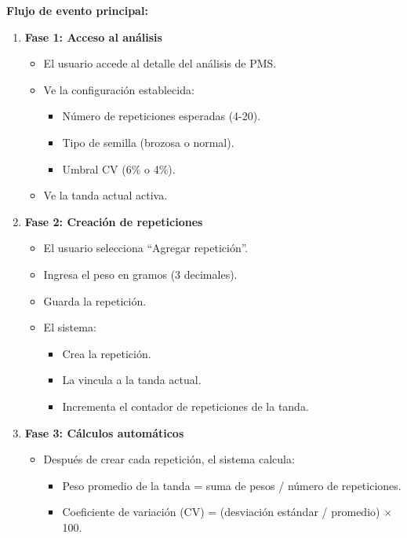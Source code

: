 \vspace{0.5em}
\noindent\textbf{Flujo de evento principal:}
\begin{enumerate}[nosep]
    \item \textbf{Fase 1: Acceso al análisis}
    \begin{itemize}[nosep]
        \item El usuario accede al detalle del análisis de PMS.
        \item Ve la configuración establecida:
        \begin{itemize}[nosep]
            \item Número de repeticiones esperadas (4-20).
            \item Tipo de semilla (brozosa o normal).
            \item Umbral CV (6\% o 4\%).
        \end{itemize}
        \item Ve la tanda actual activa.
    \end{itemize}
    \item \textbf{Fase 2: Creación de repeticiones}
    \begin{itemize}[nosep]
        \item El usuario selecciona ``Agregar repetición''.
        \item Ingresa el peso en gramos (3 decimales).
        \item Guarda la repetición.
        \item El sistema:
        \begin{itemize}[nosep]
            \item Crea la repetición.
            \item La vincula a la tanda actual.
            \item Incrementa el contador de repeticiones de la tanda.
        \end{itemize}
    \end{itemize}
    \item \textbf{Fase 3: Cálculos automáticos}
    \begin{itemize}[nosep]
        \item Después de crear cada repetición, el sistema calcula:
        \begin{itemize}[nosep]
            \item Peso promedio de la tanda = suma de pesos / número de repeticiones.
            \item Coeficiente de variación (CV) = (desviación estándar / promedio) $\times$ 100.

\end{itemize}
\end{itemize}
\end{enumerate}
